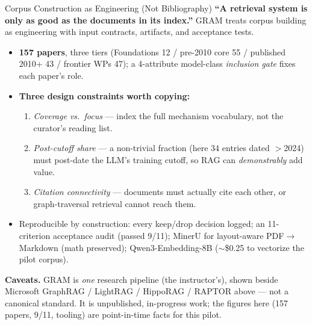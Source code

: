 \begin{frame}{Corpus Construction as Engineering (Not Bibliography)}
\textbf{``A retrieval system is only as good as the documents in its index.''} GRAM treats corpus building as engineering with input contracts, artifacts, and acceptance tests.
\begin{itemize}
\item \textbf{157 papers}, three tiers (Foundations 12 / pre-2010 core 55 / published 2010+ 43 / frontier WPs 47); a 4-attribute model-class \emph{inclusion gate} fixes each paper's role.

\medskip
\item \textbf{Three design constraints worth copying:}
\begin{enumerate}\small
    \item \emph{Coverage vs.\ focus} --- index the full mechanism vocabulary, not the curator's reading list.
    \item \emph{Post-cutoff share} --- a non-trivial fraction (here 34 entries dated $>$2024) must post-date the LLM's training cutoff, so RAG can \emph{demonstrably} add value.
    \item \emph{Citation connectivity} --- documents must actually cite each other, or graph-traversal retrieval cannot reach them.
\end{enumerate}

\medskip
\item Reproducible by construction: every keep/drop decision logged; an 11-criterion acceptance audit (passed 9/11); MinerU for layout-aware PDF$\to$Markdown (math preserved); Qwen3-Embedding-8B ($\sim$\$0.25 to vectorize the pilot corpus).
\end{itemize}
\begin{takeawaybox}
\textbf{Caveats.} GRAM is \emph{one} research pipeline (the instructor's), shown beside Microsoft GraphRAG / LightRAG / HippoRAG / RAPTOR above --- not a canonical standard. It is unpublished, in-progress work; the figures here (157 papers, 9/11, tooling) are point-in-time facts for this pilot.
\end{takeawaybox}
\end{frame}

